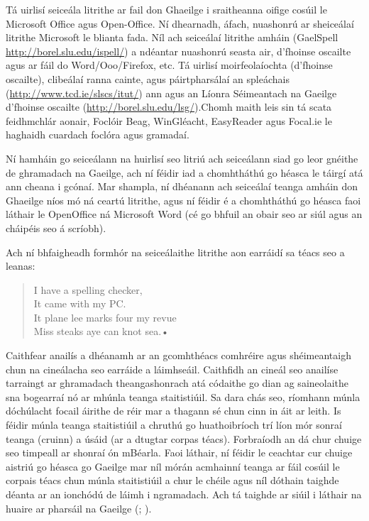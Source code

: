 \begin{multicols}{2}
Tá uirlisí seiceála litrithe ar fail don Ghaeilge i sraitheanna oifige cosúil le Microsoft Office agus Open-Office. Ní dhearnadh, áfach, nuashonrú ar sheiceálaí litrithe Microsoft le blianta fada. Níl ach seiceálaí litrithe amháin (GaelSpell \url{http://borel.slu.edu/ispell/}) a ndéantar nuashonrú seasta air, d’fhoinse oscailte agus ar fáil do Word/Ooo/Firefox, etc. Tá uirlisí moirfeolaíochta (d’fhoinse oscailte), clibeálaí ranna cainte, agus páirtpharsálaí an spleáchais (\url{http://www.tcd.ie/slscs/itut/}) ann  agus an Líonra Séimeantach na Gaeilge d’fhoinse oscailte (\url{http://borel.slu.edu/lsg/}).Chomh maith leis sin tá scata feidhmchlár aonair, Foclóir Beag, WinGléacht, EasyReader agus Focal.ie le haghaidh cuardach foclóra agus gramadaí.

Ní hamháin go seiceálann na huirlisí seo litriú ach seiceálann siad go leor gnéithe de ghramadach na Gaeilge, ach ní féidir iad a chomhtháthú go héasca le táirgí atá ann cheana i gcónaí. Mar shampla, ní dhéanann ach seiceálaí teanga amháin don Ghaeilge \cite{gramadoir} níos mó ná ceartú litrithe, agus ní féidir é a chomhtháthú go héasca faoi láthair le OpenOffice ná Microsoft Word (cé go bhfuil an obair seo ar siúl agus an cháipéis seo á scríobh).  

Ach ní bhfaigheadh formhór na seiceálaithe litrithe aon earráidí sa téacs seo \cite{zar1} a leanas: 

\begin{quote}
  I have a spelling checker,\\
  It came with my PC.\\
  It plane lee marks four my revue\\
  Miss steaks aye can knot sea.•
\end{quote}

Caithfear anailís a dhéanamh ar an gcomhthéacs comhréire agus shéimeantaigh chun na cineálacha seo earráide a láimhseáil. Caithfidh an cineál seo anailíse tarraingt ar ghramadach theangashonrach atá códaithe go dian ag saineolaithe sna bogearraí nó ar mhúnla teanga staitistiúil. Sa dara chás seo, ríomhann múnla dóchúlacht focail áirithe de réir mar a thagann sé chun cinn in áit ar leith. Is féidir múnla teanga staitistiúil a chruthú go huathoibríoch trí líon mór sonraí teanga (cruinn) a úsáid (ar a dtugtar corpas téacs). Forbraíodh an dá chur chuige seo timpeall ar shonraí ón mBéarla. Faoi láthair, ní féidir le ceachtar cur chuige aistriú go héasca go Gaeilge mar níl mórán acmhainní teanga ar fáil cosúil le corpais téacs chun múnla staitistiúil a chur le chéile agus níl dóthain taighde déanta ar an ionchódú de láimh i ngramadach. Ach tá taighde ar siúil i láthair na huaire ar pharsáil na Gaeilge (\cite{lynn2012}; \cite{elaine2010}).


\end{multicols}
